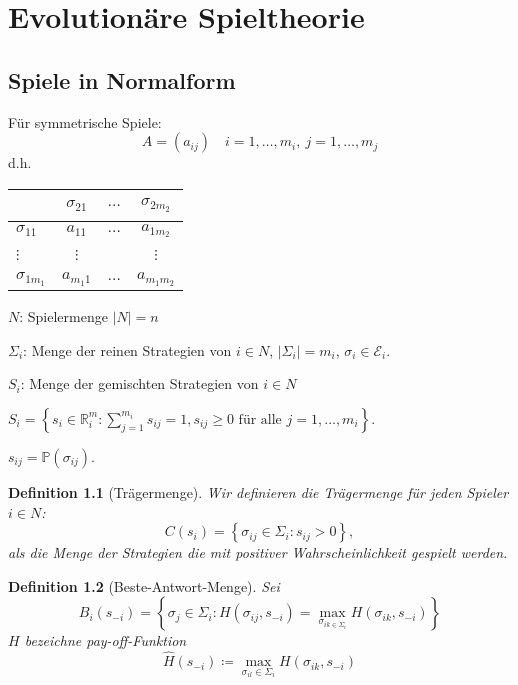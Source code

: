\documentclass[12pt]{extreport} %
\theoremstyle{named}
\theoremstyle{itshape}
\newtheorem*{definition}{Definition}
\theoremstyle{normal}
\begin{document}
\chapter{Evolutionäre Spieltheorie}

  
\section{Spiele in Normalform}
Für symmetrische Spiele:
$$ A = \left( a_{ij} \right) \quad i = 1, \dotsc, m_{i}, ~ j = 1, \dotsc, m_{j} $$
d.h.
\begin{figure*}[h!] \centering
 \begin{tabular}{l|ccc}
   ~                & $\sigma_{21}$ & $\dotsc$  & $\sigma_{2 m_{2}} $\\
  \hline
  $\sigma_{11}$     &  $a_{11}$     & $\dotsc$  & $a_{1m_{2}}$ \\
  $\vdots$          & $\vdots$      & ~         & $\vdots$ \\
  $\sigma_{1m_{1}}$ & $a_{m_{1} 1}$ & $\dotsc $ & $a_{m_{1} m_{2}}$
 \end{tabular}	
\end{figure*}

\begin{description}
	\item $N$: Spielermenge $|N| = n$
	\item $\Sigma_{i}$: Menge der reinen Strategien von $i \in N$, $\left| \Sigma_{i} \right| = m_{i}$, $\sigma_{i} \in \mathcal{E}_{i}$.
	\item $S_{i}$: Menge der gemischten Strategien von $i \in N$
		\begin{description}
			\item $S_{i} = \left\{ s_i \in \mathbb{R}^m_i : \sum_{j=1}^{m_i} s_{ij} = 1, s_{ij} \geq 0 \text{ für alle } j = 1, \dotsc, m_i \right\}$.
			\item $s_{ij} = \mathds{P}(\sigma_{ij})$.
		\end{description}
\end{description}
  
\begin{definition}[Trägermenge] Wir definieren die Trägermenge für jeden Spieler $i \in N$:
	$$ C(s_{i}) = \left\{ \sigma_{ij} \in \Sigma_{i} : s_{ij} > 0 \right\}, $$
	als die Menge der Strategien die mit positiver Wahrscheinlichkeit gespielt werden.
\end{definition}  

\begin{definition}[Beste-Antwort-Menge] Sei
	$$ B_{i}(s_{-i}) = \left\{ \sigma_{j} \in \Sigma_{i} : H(\sigma_{ij}, s_{-i}) = \max_{\sigma_{ik \in \Sigma_{i}}} H(\sigma_{ik}, s_{-i}) \right\} $$ 
	$H$ bezeichne pay-off-Funktion ~\\
	$$ \hat{H}(s_{-i}) \coloneqq \max_{\sigma_{il} \in \Sigma_{i}} H(\sigma_{ik}, s_{-i}) $$
\end{definition}
  
\end{document}
